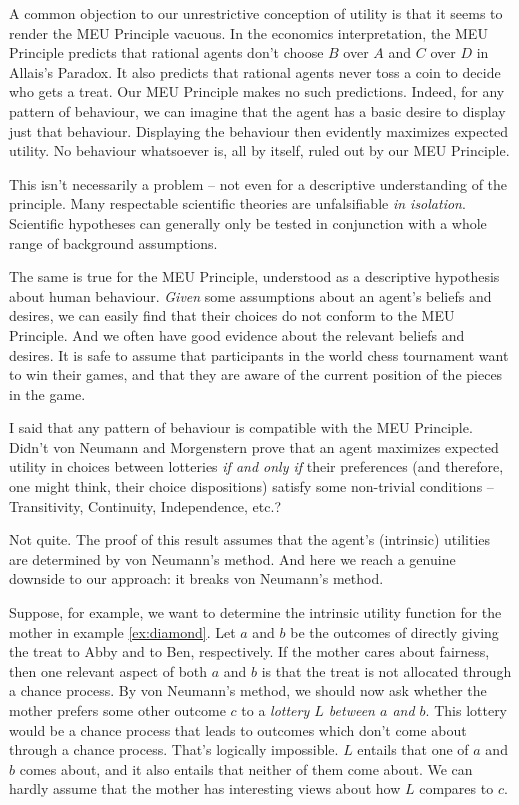 A common objection to our unrestrictive conception of utility is that it seems
to render the MEU Principle vacuous. In the economics interpretation, the MEU
Principle predicts that rational agents don't choose $B$ over $A$ and $C$ over
$D$ in Allais's Paradox. It also predicts that rational agents never toss a coin
to decide who gets a treat. Our MEU Principle makes no such predictions. Indeed,
for any pattern of behaviour, we can imagine that the agent has a basic desire
to display just that behaviour. Displaying the behaviour then evidently
maximizes expected utility. No behaviour whatsoever is, all by itself, ruled out
by our MEU Principle.

This isn't necessarily a problem -- not even for a descriptive understanding of
the principle. Many respectable scientific theories are unfalsifiable \emph{in
  isolation}. Scientific hypotheses can generally only be tested in conjunction
with a whole range of background assumptions.

The same is true for the MEU Principle, understood as a descriptive hypothesis
about human behaviour. \emph{Given} some assumptions about an agent's beliefs
and desires, we can easily find that their choices do not conform to the MEU
Principle. And we often have good evidence about the relevant beliefs and
desires. It is safe to assume that participants in the world chess
tournament want to win their games, and that they are aware of the current
position of the pieces in the game.

I said that any pattern of behaviour is compatible with the MEU Principle.
Didn't von Neumann and Morgenstern prove that an agent maximizes expected
utility in choices between lotteries \emph{if and only if} their preferences
(and therefore, one might think, their choice dispositions) satisfy some
non-trivial conditions -- Transitivity, Continuity, Independence, etc.?

Not quite. The proof of this result assumes that the agent's (intrinsic)
utilities are determined by von Neumann's method. And here we reach a genuine
downside to our approach: it breaks von Neumann's method.

Suppose, for example, we want to determine the intrinsic utility function for
the mother in example \ref{ex:diamond}. Let $a$ and $b$ be the outcomes of
directly giving the treat to Abby and to Ben, respectively. If the mother cares
about fairness, then one relevant aspect of both $a$ and $b$ is that the treat
is not allocated through a chance process. By von Neumann's method, we should
now ask whether the mother prefers some other outcome $c$ to a \emph{lottery $L$
  between $a$ and $b$}. This lottery would be a chance process that leads to
outcomes which don't come about through a chance process. That's logically
impossible. $L$ entails that one of $a$ and $b$ comes about, and it also entails
that neither of them come about. We can hardly assume that the mother has
interesting views about how $L$ compares to $c$.

